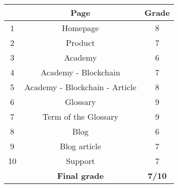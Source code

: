 \begin{center}
  \begin{longtable}{|c|c|c|}
    \hline
    & \textbf{Page} & \textbf{Grade} \\
    \hline
    1 & Homepage & 8 \\
    \hline
    2 & Product & 7 \\
    \hline
    3 & Academy & 6 \\
    \hline
    4 & Academy - Blockchain & 7 \\
    \hline
    5 & Academy - Blockchain - Article & 8 \\
    \hline
    6 & Glossary & 9 \\
    \hline
    7 & Term of the Glossary & 9 \\
    \hline
    8 & Blog & 6 \\
    \hline
    9 & Blog article & 7 \\
    \hline
    10 & Support & 7 \\
    \hline
    & \textbf{Final grade} & \textbf{7/10} \\
    \hline
  \end{longtable}
\end{center}